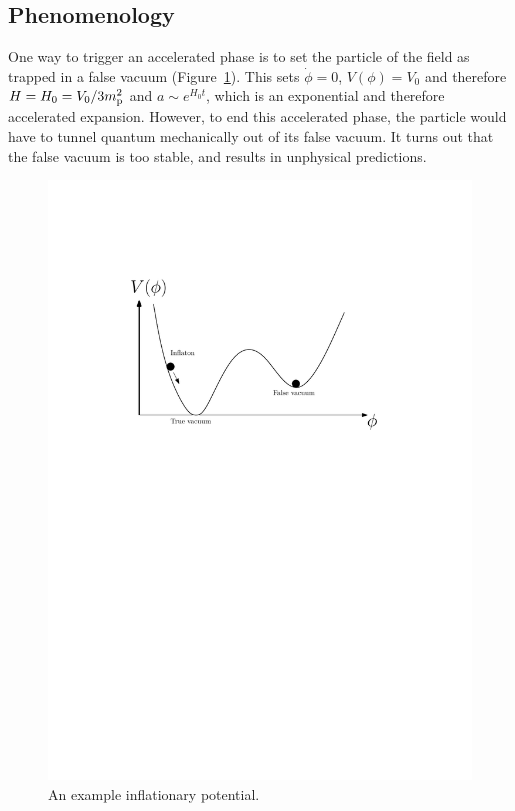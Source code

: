 \subsection{Phenomenology}
\label{sec:cos:phenomonology}
One way to trigger an accelerated phase is to set the particle of the field as trapped in a false vacuum (Figure~\ref{fig:cos:potential}). This sets \(\dot{\phi}=0\), \(V(\phi)=V_0\) and therefore \(H=H_0=V_0/3m_{\mathrm{p}}^2\) and \(a\sim e^{H_0t}\), which is an exponential and therefore accelerated expansion. However, to end this accelerated phase, the particle would have to tunnel quantum mechanically out of its false vacuum. It turns out that the false vacuum is too stable, and results in unphysical predictions.

\begin{figure}[tp]
  \centering
  \includegraphics[width=\textwidth]{chapters/inflationary_cosmology/figures/potential}
  \caption{An example inflationary potential.}\label{fig:cos:potential}
\end{figure}

